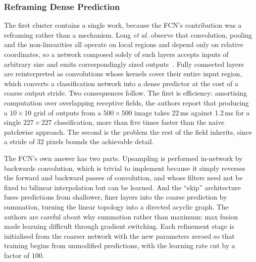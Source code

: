 \documentclass[journal]{IEEEtran}
\begin{document}
\subsubsection{Reframing Dense Prediction}
The first cluster contains a single work, because the FCN's contribution was a
reframing rather than a mechanism. Long \emph{et al.} observe that convolution,
pooling and the non-linearities all operate on local regions and depend only on
relative coordinates, so a network composed solely of such layers accepts inputs of
arbitrary size and emits correspondingly sized outputs~\cite{long2014fully}. Fully
connected layers are reinterpreted as convolutions whose kernels cover their entire
input region, which converts a classification network into a dense predictor at the
cost of a coarse output stride. Two consequences follow. The first is efficiency:
amortising computation over overlapping receptive fields, the authors report that
producing a $10\times10$ grid of outputs from a $500\times500$ image takes 22\,ms
against 1.2\,ms for a single $227\times227$ classification, more than five times
faster than the naive patchwise approach. The second is the problem the rest of the
field inherits, since a stride of 32 pixels bounds the achievable detail.

The FCN's own answer has two parts. Upsampling is performed in-network by backwards
convolution, which is trivial to implement because it simply reverses the forward and
backward passes of convolution, and whose filters need not be fixed to bilinear
interpolation but can be learned. And the ``skip'' architecture fuses predictions from
shallower, finer layers into the coarse prediction by summation, turning the linear
topology into a directed acyclic graph. The authors are careful about why summation
rather than maximum: max fusion made learning difficult through gradient switching.
Each refinement stage is initialised from the coarser network with the new parameters
zeroed so that training begins from unmodified predictions, with the learning rate cut
by a factor of 100.
\end{document}
